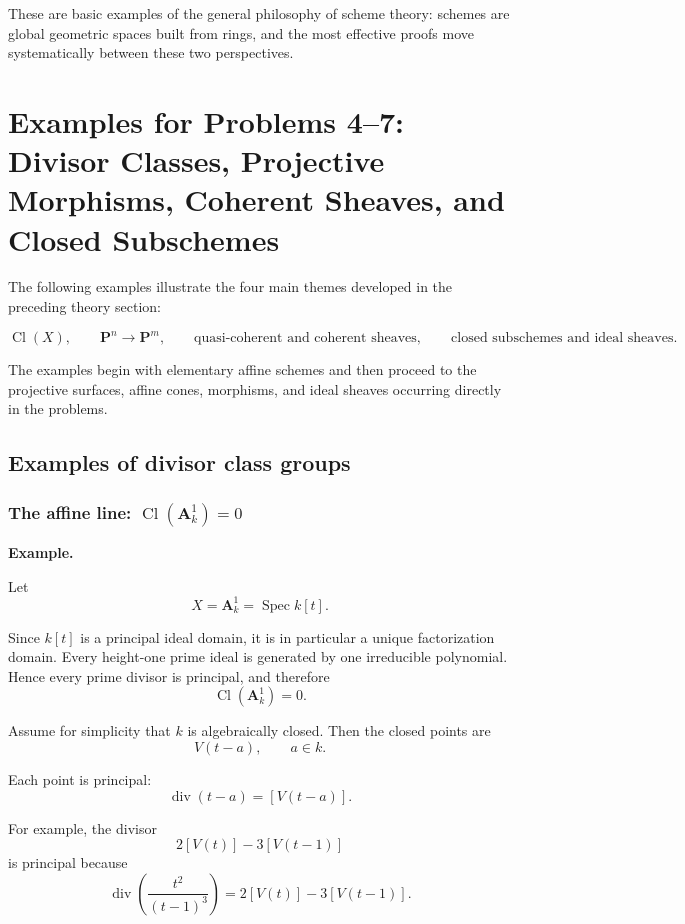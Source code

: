 \documentclass[12pt,a4paper]{article}
\theoremstyle{notespace}
\begin{document}
These are basic examples of the general philosophy of scheme theory: schemes are global geometric spaces built from rings, and the most effective proofs move systematically between these two perspectives.

\section{Examples for Problems 4--7:
	Divisor Classes, Projective Morphisms, Coherent Sheaves, and Closed Subschemes}

The following examples illustrate the four main themes developed in the preceding theory section:

\[
\operatorname{Cl}(X),\qquad
\mathbf P^n\longrightarrow \mathbf P^m,\qquad
\text{quasi-coherent and coherent sheaves},\qquad
\text{closed subschemes and ideal sheaves}.
\]

The examples begin with elementary affine schemes and then proceed to the projective surfaces, affine cones, morphisms, and ideal sheaves occurring directly in the problems.

\subsection{Examples of divisor class groups}

\subsubsection{\texorpdfstring{The affine line: \(\operatorname{Cl}(\mathbf A^1_k)=0\)}{The affine line}}

\textbf{Example.}

Let
\[
X=\mathbf A^1_k=\operatorname{Spec}k[t].
\]

Since \(k[t]\) is a principal ideal domain, it is in particular a unique factorization domain. Every height-one prime ideal is generated by one irreducible polynomial. Hence every prime divisor is principal, and therefore
\[
\boxed{
	\operatorname{Cl}(\mathbf A^1_k)=0.
}
\]

Assume for simplicity that \(k\) is algebraically closed. Then the closed points are
\[
V(t-a),
\qquad a\in k.
\]

Each point is principal:
\[
\operatorname{div}(t-a)=[V(t-a)].
\]

For example, the divisor
\[
2[V(t)]-3[V(t-1)]
\]
is principal because
\[
\operatorname{div}\left(\frac{t^2}{(t-1)^3}\right)
=
2[V(t)]-3[V(t-1)].
\]
\end{document}
